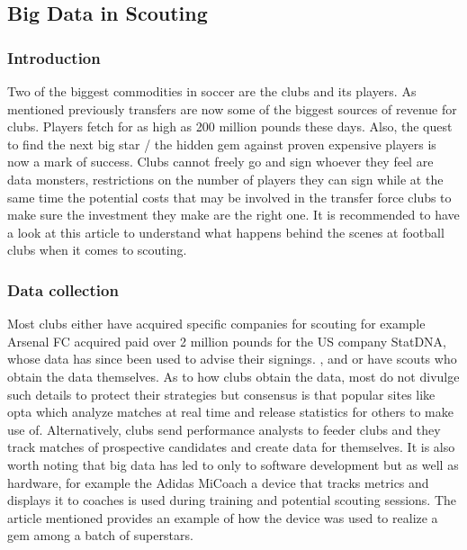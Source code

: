 \documentclass[sigconf]{acmart}
\begin{document}
\subsection{Big Data in Scouting}

\subsubsection{Introduction}

Two of the biggest commodities in soccer are the clubs and its players. As mentioned previously transfers are now some of the biggest sources of revenue for clubs. Players fetch for as high as 200 million pounds these days\cite{wikipedia}. Also, the quest to find the next big star / the hidden gem against proven expensive players is now a mark of success. Clubs cannot freely go and sign whoever they feel are data monsters, restrictions on the number of players they can sign while at the same time the potential costs that may be involved in the transfer force clubs to make sure the investment they make are the right one. It is recommended to have a look at this article to understand what happens behind the scenes at football clubs when it comes to scouting\cite{2012}.

\subsubsection{Data collection}

Most clubs either have acquired specific companies for scouting for example Arsenal FC acquired paid over 2 million pounds for the US company StatDNA, whose data has since been used to advise their signings. \cite{Outsideoftheboot2000}, and or have scouts who obtain the data themselves. As to how clubs obtain the data, most do not divulge such details to protect their strategies but consensus is that popular sites like opta which analyze matches at real time and release statistics for others to make use of\cite{Optasports2000}. Alternatively, clubs send performance analysts to feeder clubs and they track matches of prospective candidates and create data for themselves.\newline
It is also worth noting that big data has led to only to software development but as well as hardware, for example the Adidas MiCoach a device that tracks metrics and displays it to coaches is used during training and potential scouting sessions. The article mentioned provides an example of how the device was used to realize a gem among a batch of superstars.\cite{2000}
\end{document}
